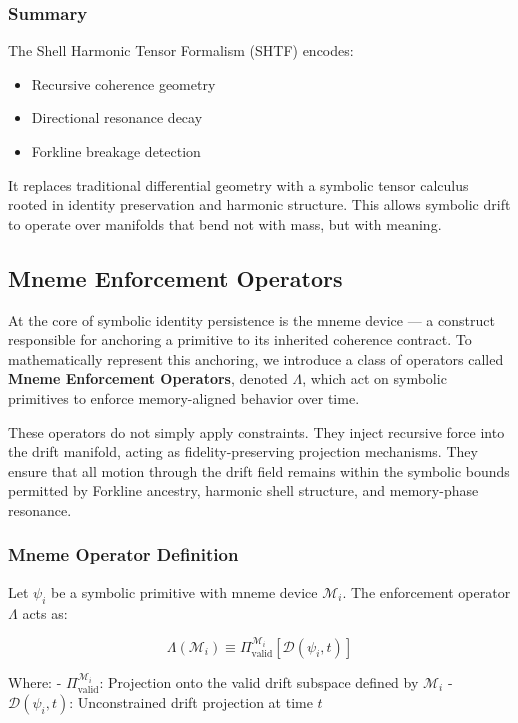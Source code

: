\documentclass[12pt]{article}
\begin{document}
\subsubsection{Summary}

The Shell Harmonic Tensor Formalism (SHTF) encodes:
\begin{itemize}[noitemsep]
  \item Recursive coherence geometry
  \item Directional resonance decay
  \item Forkline breakage detection
\end{itemize}

It replaces traditional differential geometry with a symbolic tensor calculus rooted in identity preservation and harmonic structure. This allows symbolic drift to operate over manifolds that bend not with mass, but with meaning.

\subsection{Mneme Enforcement Operators}

At the core of symbolic identity persistence is the mneme device — a construct responsible for anchoring a primitive to its inherited coherence contract. To mathematically represent this anchoring, we introduce a class of operators called \textbf{Mneme Enforcement Operators}, denoted \( \Lambda \), which act on symbolic primitives to enforce memory-aligned behavior over time.

These operators do not simply apply constraints. They inject recursive force into the drift manifold, acting as fidelity-preserving projection mechanisms. They ensure that all motion through the drift field remains within the symbolic bounds permitted by Forkline ancestry, harmonic shell structure, and memory-phase resonance.

\subsubsection{Mneme Operator Definition}

Let \( \psi_i \) be a symbolic primitive with mneme device \( \mathcal{M}_i \). The enforcement operator \( \Lambda \) acts as:

\[
\Lambda(\mathcal{M}_i) \equiv \Pi_{\text{valid}}^{\mathcal{M}_i} \left[ \mathcal{D}(\psi_i, t) \right]
\]

Where:
- \( \Pi_{\text{valid}}^{\mathcal{M}_i} \): Projection onto the valid drift subspace defined by \( \mathcal{M}_i \)
- \( \mathcal{D}(\psi_i, t) \): Unconstrained drift projection at time \( t \)
\end{document}
